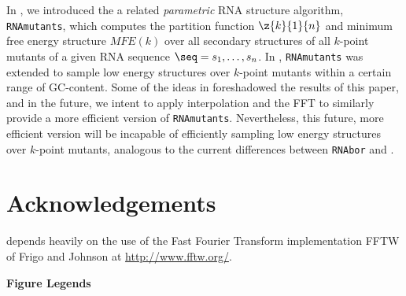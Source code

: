In \cite{CloWalBehSte05,Waldispuhl.pcb08}, we introduced the a related
{\em parametric} RNA structure algorithm, {\tt RNAmutants}, which computes
the partition function $\z{k}{1}{n}$ and minimum free energy
structure $MFE(k)$ over all secondary structures of all $k$-point mutants
of a given RNA sequence $\seq=s_1,\ldots,s_n$. In  \cite{WaPo2011},
{\tt RNAmutants} was extended to sample low energy structures over
$k$-point mutants within a certain range of GC-content. Some of the ideas
in \cite{WaPo2011} foreshadowed the results of this paper, and in the
future, we intent to apply interpolation and the FFT to similarly provide a
more efficient version of {\tt RNAmutants}. Nevertheless, this future,
more efficient version will be incapable of efficiently sampling low
energy structures over $k$-point mutants, analogous to the current
differences between {\tt RNAbor} and \fftbor.


\section*{Acknowledgements}

\fftbor depends heavily on the
use of the Fast Fourier Transform implementation FFTW of Frigo and Johnson
\cite{FFTW05} at \url{http://www.fftw.org/}.






\newpage
%

%


\hfill\break
\hfill\break
\newpage

\noindent
{\bf\Large Figure Legends}


